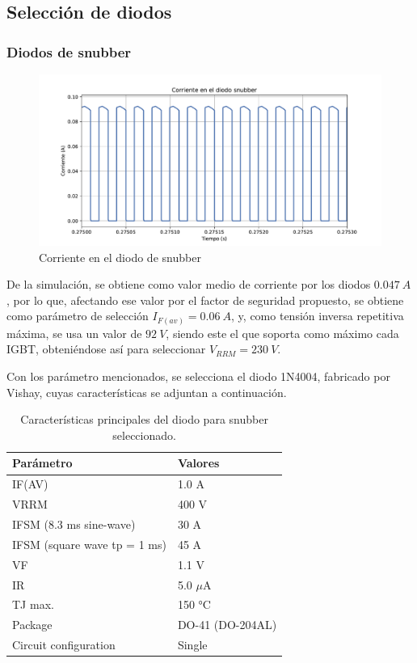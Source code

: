 \subsection{Selección de diodos}

\subsubsection{Diodos de snubber}

\begin{figure}
	\centering
	\includegraphics[width=1\linewidth]{img/diodo_snubber}
	\caption{Corriente en el diodo de snubber}
	\label{fig:diodosnubber}
\end{figure}


De la simulación, se obtiene como valor medio de corriente por los diodos $0.047 \ A$, por lo que, afectando ese valor por el factor de seguridad propuesto, se obtiene como parámetro de selección $I_{F(av)}=0.06 \ A$, y, como tensión inversa repetitiva máxima, se usa un valor de $92 \ V$, siendo este el que soporta como máximo cada IGBT, obteniéndose así para seleccionar $V_{RRM}=230 \ V$. 

Con los parámetro mencionados, se selecciona el diodo 1N4004, fabricado por Vishay, cuyas características se adjuntan a continuación.

\begin{table}[h]
		\begin{tabular}{|l|l|}
			\hline
			\textbf{Parámetro} & \textbf{Valores} \\
			\hline
			IF(AV) & 1.0 A \\
			\hline
			VRRM & 400 V \\
			\hline
			IFSM (8.3 ms sine-wave) & 30 A \\
			\hline
			IFSM (square wave tp = 1 ms) & 45 A \\
			\hline
			VF & 1.1 V \\
			\hline
			IR & 5.0 $\mu$A \\
			\hline
			TJ max. & 150 °C \\
			\hline
			Package & DO-41 (DO-204AL) \\
			\hline
			Circuit configuration & Single \\
			\hline
		\end{tabular}
		\caption{Características principales del diodo para snubber seleccionado.}
\end{table}

